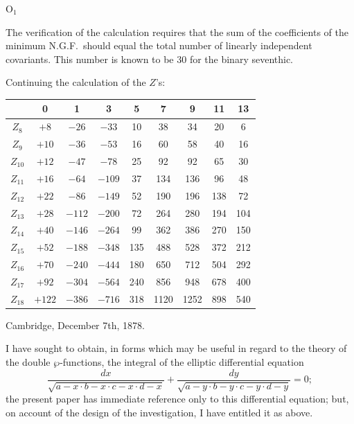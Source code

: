 \documentclass[11pt,a4paper]{book}
\begin{document}
\clearpage
$\mathrm{O}_1$

The verification of the calculation requires that the sum of the coefficients of the minimum N.G.F.\ should equal the total number of linearly independent covariants. This number is known to be 30 for the binary seventhic.

Continuing the calculation of the $Z$'s:

\begin{center}
\begin{tabular}{c|cccccccc}
& 0 & 1 & 3 & 5 & 7 & 9 & 11 & 13 \\
\hline
$Z_8$ & $+8$ & $-26$ & $-33$ & 10 & 38 & 34 & 20 & 6 \\
$Z_9$ & $+10$ & $-36$ & $-53$ & 16 & 60 & 58 & 40 & 16 \\
$Z_{10}$ & $+12$ & $-47$ & $-78$ & 25 & 92 & 92 & 65 & 30 \\
$Z_{11}$ & $+16$ & $-64$ & $-109$ & 37 & 134 & 136 & 96 & 48 \\
$Z_{12}$ & $+22$ & $-86$ & $-149$ & 52 & 190 & 196 & 138 & 72 \\
$Z_{13}$ & $+28$ & $-112$ & $-200$ & 72 & 264 & 280 & 194 & 104 \\
$Z_{14}$ & $+40$ & $-146$ & $-264$ & 99 & 362 & 386 & 270 & 150 \\
$Z_{15}$ & $+52$ & $-188$ & $-348$ & 135 & 488 & 528 & 372 & 212 \\
$Z_{16}$ & $+70$ & $-240$ & $-444$ & 180 & 650 & 712 & 504 & 292 \\
$Z_{17}$ & $+92$ & $-304$ & $-564$ & 240 & 856 & 948 & 678 & 400 \\
$Z_{18}$ & $+122$ & $-386$ & $-716$ & 318 & 1120 & 1252 & 898 & 540
\end{tabular}
\end{center}

Cambridge, December 7th, 1878.

\clearpage

I have sought to obtain, in forms which may be useful in regard to the theory of the double $\wp$-functions, the integral of the elliptic differential equation
\[
\frac{dx}{\sqrt{a - x \cdot b - x \cdot c - x \cdot d - x}} + \frac{dy}{\sqrt{a - y \cdot b - y \cdot c - y \cdot d - y}} = 0;
\]
the present paper has immediate reference only to this differential equation; but, on account of the design of the investigation, I have entitled it as above.
\end{document}
